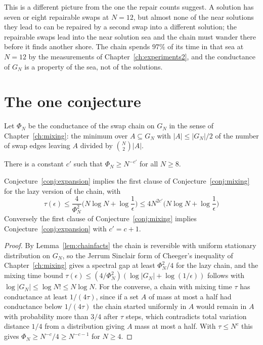 This is a different picture from the one the repair counts suggest. A solution has seven or eight repairable swaps at $N = 12$, but almost none of the near solutions they lead to can be repaired by a second swap into a different solution; the repairable swaps lead into the near solution sea and the chain must wander there before it finds another shore. The chain spends $97\%$ of its time in that sea at $N = 12$ by the measurements of Chapter~\ref{ch:experiments2}, and the conductance of $G_N$ is a property of the sea, not of the solutions.

\section{The one conjecture}

Let $\Phi_N$ be the conductance of the swap chain on $G_N$ in the sense of Chapter~\ref{ch:mixing}: the minimum over $A \subseteq G_N$ with $|A| \le |G_N|/2$ of the number of swap edges leaving $A$ divided by $\binom{N}{2} |A|$.

\begin{conjecture}
\label{conj:expansion}
There is a constant $c'$ such that $\Phi_N \ge N^{-c'}$ for all $N \ge 8$.
\end{conjecture}

\begin{theorem}
\label{thm:reduction}
Conjecture~\ref{conj:expansion} implies the first clause of Conjecture~\ref{conj:mixing} for the lazy version of the chain, with
\[
\tau(\epsilon) \le \frac{4}{\Phi_N^2} \Big( N \log N + \log \frac{1}{\epsilon} \Big) \le 4 N^{2c'} \Big( N \log N + \log \frac{1}{\epsilon} \Big)
\]
Conversely the first clause of Conjecture~\ref{conj:mixing} implies Conjecture~\ref{conj:expansion} with $c' = c + 1$.
\end{theorem}

\begin{proof}
By Lemma~\ref{lem:chainfacts} the chain is reversible with uniform stationary distribution on $G_N$, so the Jerrum Sinclair form of Cheeger's inequality of Chapter~\ref{ch:mixing} gives a spectral gap at least $\Phi_N^2 / 4$ for the lazy chain, and the mixing time bound $\tau(\epsilon) \le (4 / \Phi_N^2) (\log |G_N| + \log(1/\epsilon))$ follows with $\log |G_N| \le \log N! \le N \log N$. For the converse, a chain with mixing time $\tau$ has conductance at least $1 / (4 \tau)$, since if a set $A$ of mass at most a half had conductance below $1/(4\tau)$ the chain started uniformly in $A$ would remain in $A$ with probability more than $3/4$ after $\tau$ steps, which contradicts total variation distance $1/4$ from a distribution giving $A$ mass at most a half. With $\tau \le N^c$ this gives $\Phi_N \ge N^{-c} / 4 \ge N^{-c-1}$ for $N \ge 4$.
\end{proof}

